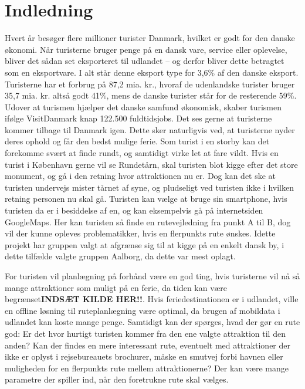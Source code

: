\chapter{Indledning}

Hvert år besøger flere millioner turister Danmark, hvilket er godt for den danske økonomi. Når turisterne bruger penge på en dansk vare, service eller oplevelse, bliver det sådan set eksporteret til udlandet – og derfor bliver dette betragtet som en eksportvare. I alt står denne eksport type for 3,6\% af den danske eksport. Turisterne har et forbrug på 87,2 mia. kr., hvoraf de udenlandske turister bruger 35,7 mia. kr. altså godt 41\%, mens de danske turister står for de resterende 59\%. Udover at turismen hjælper det danske samfund økonomisk, skaber turismen ifølge VisitDanmark knap 122.500 fuldtidsjobs. \citep{faktaogtalVD}  \newline
Det ses gerne at turisterne kommer tilbage til Danmark igen. Dette sker naturligvis ved, at turisterne nyder deres ophold og får den bedst mulige ferie. Som turist i en storby kan det forekomme svært at finde rundt, og samtidigt virke let at fare vildt. Hvis en turist i København gerne vil se Rundetårn, skal turisten blot kigge efter det store monument, og gå i den retning hvor attraktionen nu er. Dog kan det ske at turisten undervejs mister tårnet af syne, og pludseligt ved turisten ikke i hvilken retning personen nu skal gå. Turisten kan vælge at bruge sin smartphone, hvis turisten da er i besiddelse af en, og kan eksempelvis gå på internetsiden GoogleMaps. Her kan turisten så finde en rutevejledning fra punkt A til B, dog vil der kunne opleves problematikker, hvis en flerpunkts rute ønskes. Idette projekt har gruppen valgt at afgrænse sig til at kigge på en enkelt dansk by, i dette tilfælde valgte gruppen Aalborg, da dette var mest oplagt.  \newline

For turisten vil planlægning på forhånd være en god ting, hvis turisterne vil nå så mange attraktioner som muligt på en ferie, da tiden kan være begrænset\textbf{INDSÆT KILDE HER!!}. Hvis feriedestinationen er i udlandet, ville en offline løsning til ruteplanlægning være optimal, da brugen af mobildata i udlandet kan koste mange penge\citep {TDC}. \newline
Samtidigt kan der spørges, hvad der gør en rute god: Er det hvor hurtigt turisten kommer fra den ene valgte attraktion til den anden? Kan der findes en mere interessant rute, eventuelt med attraktioner der ikke er oplyst i rejsebureauets brochurer, måske en smutvej forbi havnen eller muligheden for en flerpunkts rute mellem attraktionerne? Der kan være mange parametre der spiller ind, når den foretrukne rute skal vælges. \newline


